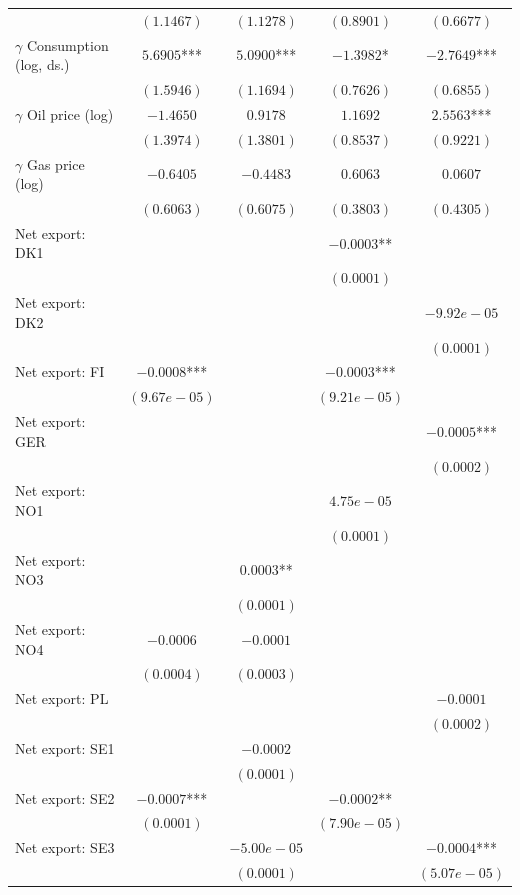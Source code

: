 \begin{table}[htbp]
{\begin{tabular}{lcccc}
 & $(1.1467)$ & $(1.1278)$ & $(0.8901)$ & $(0.6677)$ \\[3pt]
\quad $\gamma$ Consumption (log, ds.) & $5.6905$*** & $5.0900$*** & $-1.3982$* & $-2.7649$*** \\
 & $(1.5946)$ & $(1.1694)$ & $(0.7626)$ & $(0.6855)$ \\[3pt]
\quad $\gamma$ Oil price (log) & $-1.4650$ & $0.9178$ & $1.1692$ & $2.5563$*** \\
 & $(1.3974)$ & $(1.3801)$ & $(0.8537)$ & $(0.9221)$ \\[3pt]
\quad $\gamma$ Gas price (log) & $-0.6405$ & $-0.4483$ & $0.6063$ & $0.0607$ \\
 & $(0.6063)$ & $(0.6075)$ & $(0.3803)$ & $(0.4305)$ \\[3pt]
\quad Net export: DK1 &  &  & $-0.0003$** &  \\
 &  &  & $(0.0001)$ &  \\[3pt]
\quad Net export: DK2 &  &  &  & $-9.92e-05$ \\
 &  &  &  & $(0.0001)$ \\[3pt]
\quad Net export: FI & $-0.0008$*** &  & $-0.0003$*** &  \\
 & $(9.67e-05)$ &  & $(9.21e-05)$ &  \\[3pt]
\quad Net export: GER &  &  &  & $-0.0005$*** \\
 &  &  &  & $(0.0002)$ \\[3pt]
\quad Net export: NO1 &  &  & $4.75e-05$ &  \\
 &  &  & $(0.0001)$ &  \\[3pt]
\quad Net export: NO3 &  & $0.0003$** &  &  \\
 &  & $(0.0001)$ &  &  \\[3pt]
\quad Net export: NO4 & $-0.0006$ & $-0.0001$ &  &  \\
 & $(0.0004)$ & $(0.0003)$ &  &  \\[3pt]
\quad Net export: PL &  &  &  & $-0.0001$ \\
 &  &  &  & $(0.0002)$ \\[3pt]
\quad Net export: SE1 &  & $-0.0002$ &  &  \\
 &  & $(0.0001)$ &  &  \\[3pt]
\quad Net export: SE2 & $-0.0007$*** &  & $-0.0002$** &  \\
 & $(0.0001)$ &  & $(7.90e-05)$ &  \\[3pt]
\quad Net export: SE3 &  & $-5.00e-05$ &  & $-0.0004$*** \\
 &  & $(0.0001)$ &  & $(5.07e-05)$ \\[3pt]

\end{tabular}}
\end{table}
